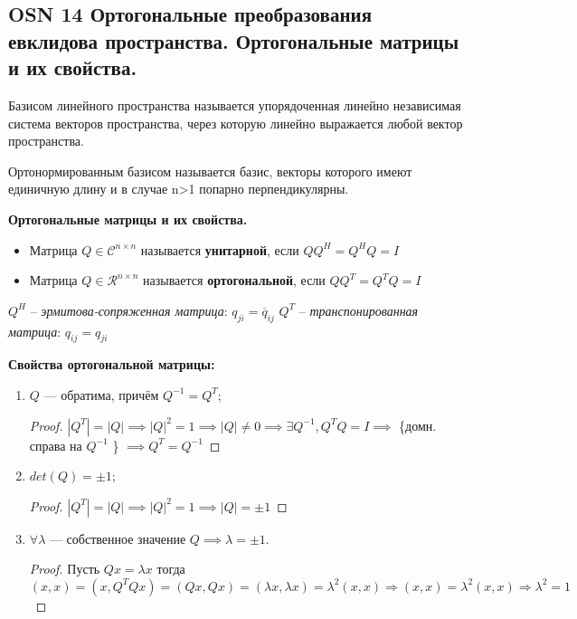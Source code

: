 \subsection*{OSN 14 Ортогональные преобразования евклидова пространства. Ортогональные матрицы и их свойства.}

Базисом линейного пространства называется упорядоченная линейно независимая система векторов пространства, через которую линейно выражается любой вектор пространства. 

Ортонормированным базисом называется
базис, векторы которого имеют единичную длину и в случае n>1 попарно перпендикулярны. 

\textbf{Ортогональные матрицы и их свойства.}
\begin{itemize}
    \item Матрица $Q \in \mathcal{C}^{n \times n}$ называется \textbf{унитарной}, если \newline $QQ^H = Q^HQ=I$
    \item Матрица $Q \in \mathcal{R}^{n \times n}$ называется \textbf{ортогональной}, если \newline $QQ^T = Q^TQ=I$
 
\end{itemize}   

$Q^H$ -- \textit{эрмитова-сопряженная матрица}: $q_{ji} = \overline{q}_{ij}$   \newline
$Q^T$ -- \textit{транспонированная матрица}: $q_{ij} = q_{ji}$

\textbf{Свойства ортогональной матрицы:}
    \begin{enumerate}
        \item $Q$ --- обратима, причём $Q^{-1}=Q^T$;
        
        \begin{proof}
        $\left|Q^T\right|=\left|Q\right| \implies \left|Q\right|^2 = 1 \implies \left|Q\right| \neq 0 \implies \exists Q^{-1}, Q^TQ=I \implies$ \{домн. справа на $Q^{-1}$ \} $\implies Q^T=Q^{-1}$
        \end{proof}
        
        \item $det(Q) = \pm1$;
        
        \begin{proof}
        $\left|Q^T\right|=\left|Q\right| \implies \left|Q\right|^2 = 1 \implies \left|Q\right| = \pm 1$
        \end{proof}
        
        \item $\forall \lambda$ --- собственное значение $Q\implies \lambda=\pm1$.
        \begin{proof}
        Пусть $Qx=\lambda x$ тогда $(x,x)=(x,Q^TQx) = (Qx,Qx) = (\lambda x,\lambda x) = \lambda^2(x,x) \Rightarrow (x,x) = \lambda^2(x,x) \Rightarrow \lambda^2 = 1$

        \end{proof}
    \end{enumerate}
 
